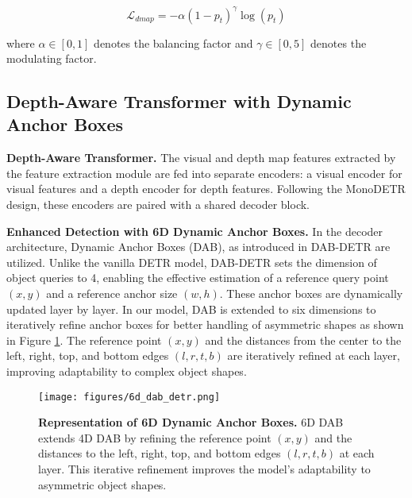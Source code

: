 \begin{equation}
\mathcal{L}_{dmap} = -\alpha (1-p_t)^\gamma \log(p_t)
\end{equation}

\noindent where $\alpha \in [0, 1] $  denotes the balancing factor and $\gamma \in [0, 5]$ denotes the modulating factor.

\subsection{Depth-Aware Transformer with Dynamic Anchor Boxes}
\textbf{Depth-Aware Transformer.} The visual and depth map features extracted by the feature extraction module are fed into separate encoders: a visual encoder for visual features and a depth encoder for depth features. Following the MonoDETR \cite{zhang2023monodetr} design, these encoders are paired with a shared decoder block.

\textbf{Enhanced Detection with 6D Dynamic Anchor Boxes.} In the decoder architecture, Dynamic Anchor Boxes (DAB), as introduced in DAB-DETR \cite{liu2022dab} are utilized. Unlike the vanilla DETR model, DAB-DETR sets the dimension of object queries to 4, enabling the effective estimation of a reference query point $(x, y)$ and a reference anchor size $(w, h)$. These anchor boxes are dynamically updated layer by layer. In our model, DAB is extended to six dimensions to iteratively refine anchor boxes for better handling of asymmetric shapes as shown in Figure \ref{fig:6D-DAB-DETR}. The reference point $(x, y)$ and the distances from the center to the left, right, top, and bottom edges $(l, r, t, b)$ are iteratively refined at each layer, improving adaptability to complex object shapes.

\begin{figure}[h]
    \centering
    \texttt{[image: figures/6d\_dab\_detr.png]}
    \caption[Representation of 6D Dynamic Anchor Boxes]{\textbf{Representation of 6D Dynamic Anchor Boxes.} 6D DAB extends 4D DAB by refining the reference point $(x, y)$ and the distances to the left, right, top, and bottom edges $(l, r, t, b)$ at each layer. This iterative refinement improves the model's adaptability to asymmetric object shapes.
    } \label{fig:6D-DAB-DETR}
\end{figure}

